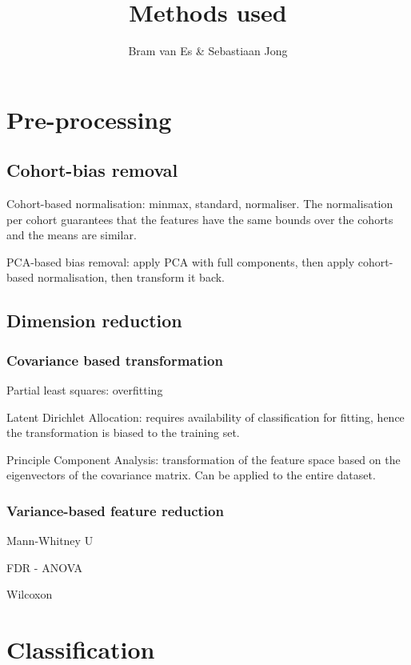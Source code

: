 \documentclass[a4paper,10pt]{article}
\title{Methods used}
\author{Bram van Es \& Sebastiaan Jong}
\begin{document}
\maketitle

\begin{abstract}

\end{abstract}


\section{Pre-processing}

\subsection{Cohort-bias removal}

Cohort-based normalisation: minmax, standard, normaliser.
The normalisation per cohort guarantees that the features have the same bounds 
over the cohorts and the means are similar.

PCA-based bias removal: apply PCA with full components, then apply cohort-based normalisation, 
then transform it back. 

\subsection{Dimension reduction}
\subsubsection{Covariance based transformation}

Partial least squares: overfitting

Latent Dirichlet Allocation: requires availability of classification for fitting, hence
the transformation is biased to the training set.

Principle Component Analysis: transformation of the feature space based on the eigenvectors 
of the covariance matrix. Can be applied to the entire dataset. 

\subsubsection{Variance-based feature reduction}

Mann-Whitney U

FDR - ANOVA

Wilcoxon 

\section{Classification}
\end{document}
